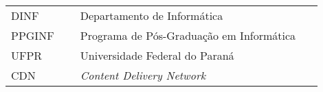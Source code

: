 

\begin{listaacron}

\begin{longtable}[l]{p{0.2\linewidth}p{0.7\linewidth}}
DINF & Departamento de Informática\\
PPGINF & Programa de Pós-Graduação em Informática\\
UFPR & Universidade Federal do Paraná\\
CDN & \emph{Content Delivery Network}\\
\end{longtable}

\end{listaacron}

